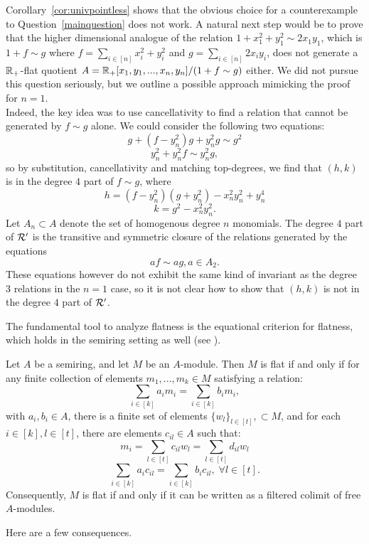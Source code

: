 \begin{remark}
Corollary~\ref{cor:univpointless} shows that the obvious choice for a counterexample to Question~\ref{mainquestion} does not work. 
A natural next step would be to prove that the higher dimensional analogue of the relation $1+x_1^2+y_1^2 \sim 2x_1y_1$, which is 
$1+f \sim g$ where $f=\sum_{i \in [n]} x_i^2 + y_i^2$ and $g=\sum_{i \in [n]} 2x_iy_i$, does not generate a $\bb{R}_{+}$-flat quotient
$A=\bb{R}_{+}[x_1,y_1,...,x_n,y_n]/(1+f \sim g)$ either. We did not pursue this question seriously, but we outline a possible approach mimicking the proof for $n=1$.\\
\indent Indeed, the key idea was to use cancellativity to find a relation that cannot be generated by $f \sim g$ alone. We could consider the following two equations:
\[g+(f-y_n^2)g + y_n^2g \sim g^2\]
\[y_n^2+ y_n^2f \sim y_n^2g,\]
so by substitution, cancellativity and matching top-degrees, we find that $(h,k)$ is in the degree $4$ part of $f \sim g$, where 
\[h=(f-y_n^2)(g+y_n^2)- x_n^2y_n^2 + y_n^4 \]
\[k=g^2 - x_n^2y_n^2.\]
Let $A_n \subset A$ denote the set of homogenous degree $n$ monomials. The degree $4$ part of $\cal{R}'$ is the transitive and symmetric closure of the relations
generated by the equations
\[af \sim ag, a \in A_2.\]
These equations however do not exhibit the same kind of invariant as the degree $3$ relations in the $n=1$ case, so it is not clear how to show that $(h,k)$ is not in the degree $4$ part of $\cal{R}'$.
\end{remark}
The fundamental tool to analyze flatness is the equational criterion for flatness, which holds in the semiring setting as well (see \cite[3.5]{borgersemi}).
\begin{theorem}\label{theorem:equationalflatness}
Let $A$ be a semiring, and let $M$ be an $A$-module. Then $M$ is flat if and only if for any finite collection of elements $m_1,...,m_k \in M$ satisfying a relation:
\[\sum_{i\in [k]} a_{i}m_i = \sum_{i\in [k]} b_{i}m_i,\]
with $a_{i}, b_{i} \in A$, there is a finite set of elements $\{w_l\}_{l\in [t]}, \subset M$, and for each $i\in[k], l \in [t]$,
there are elements $c_{il} \in A$ such that:
\[m_i = \sum_{l\in [t]} c_{il}w_l = \sum_{l\in [t]} d_{il}w_l\]
\[\sum_{i\in [k]} a_{i}c_{il} = \sum_{i\in [k]} b_{i}c_{il}, \; \forall l \in [t].\]
Consequently, $M$ is flat if and only if it can be written as a filtered colimit of free $A$-modules.
\end{theorem}
Here are a few consequences.
